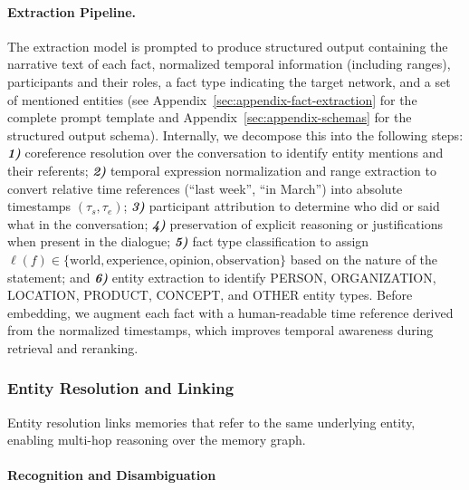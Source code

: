 \paragraph{Extraction Pipeline.}
The extraction model is prompted to produce structured output containing the narrative text of each fact, normalized temporal information (including ranges), participants and their roles, a fact type indicating the target network, and a set of mentioned entities (see Appendix~\ref{sec:appendix-fact-extraction} for the complete prompt template and Appendix~\ref{sec:appendix-schemas} for the structured output schema). Internally, we decompose this into the following steps: \textbf{\textit{1)}} coreference resolution over the conversation to identify entity mentions and their referents; \textbf{\textit{2)}} temporal expression normalization and range extraction to convert relative time references (``last week'', ``in March'') into absolute timestamps $(\tau_s, \tau_e)$; \textbf{\textit{3)}} participant attribution to determine who did or said what in the conversation; \textbf{\textit{4)}} preservation of explicit reasoning or justifications when present in the dialogue; \textbf{\textit{5)}} fact type classification to assign $\ell(f) \in \{\text{world}, \text{experience}, \text{opinion}, \text{observation}\}$ based on the nature of the statement; and \textbf{\textit{6)}} entity extraction to identify PERSON, ORGANIZATION, LOCATION, PRODUCT, CONCEPT, and OTHER entity types.
Before embedding, we augment each fact with a human-readable time reference derived from the normalized timestamps, which improves temporal awareness during retrieval and reranking.

\subsubsection{Entity Resolution and Linking}

Entity resolution links memories that refer to the same underlying entity, enabling multi-hop reasoning over the memory graph.

\paragraph{Recognition and Disambiguation}

